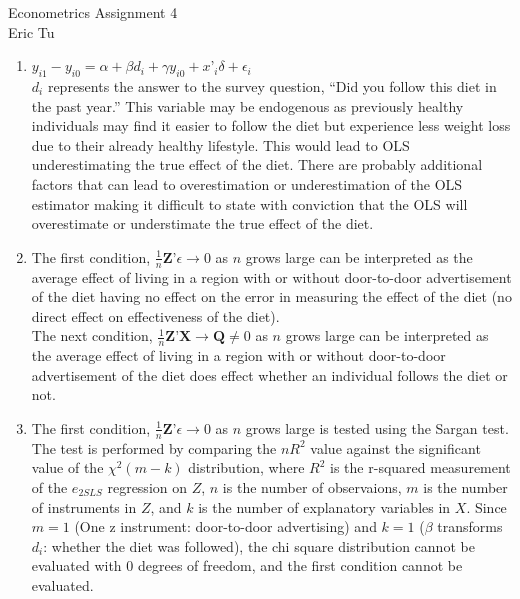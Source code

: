 \documentclass{article}
\begin{document}
\begin{center}
Econometrics Assignment 4 \\
Eric Tu
\end{center}

\begin{enumerate}[label=(\alph*)]
	\item
	$y_{i1} - y_{i0} = \alpha + \beta d_{i} + \gamma y_{i0} + x’_{i}\delta + \epsilon_{i}$ \\
	
	$d_{i}$ represents the answer to the survey question, “Did you follow this diet in the past year.” This variable may be endogenous as previously healthy individuals may find it easier to follow the diet but experience less weight loss due to their already healthy lifestyle. This would lead to OLS underestimating the true effect of the diet. There are probably additional factors that can lead to overestimation or underestimation of the OLS estimator making it difficult to state with conviction that the OLS will overestimate or understimate the true effect of the diet.

	\item 
	The first condition, $\frac{1}{n}\mathbf{Z}’\epsilon \rightarrow 0$ as $n$ grows large can be interpreted as the average effect of living in a region with or without door-to-door advertisement of the diet having no effect on the error in measuring the effect of the diet (no direct effect on effectiveness of the diet). \\
	\smallskip
	The next condition, $\frac{1}{n}\mathbf{Z}’\mathbf{X} \rightarrow \mathbf{Q} \neq 0$ as $n$ grows large can be interpreted as the average effect of living in a region with or without door-to-door advertisement of the diet does effect whether an individual follows the diet or not.
	
	\item
	The first condition, $\frac{1}{n}\mathbf{Z}’\epsilon \rightarrow 0$ as $n$ grows large is tested using the Sargan test. The test is performed by comparing the $nR^{2}$ value against the significant value of the $\chi^{2}(m-k)$ distribution, where $R^{2}$ is the r-squared measurement of the $e_{2SLS}$ regression on $Z$, $n$ is the number of observaions, $m$ is the number of instruments in $Z$, and $k$ is the number of explanatory variables in $X$. Since $m=1$ (One z instrument: door-to-door advertising) and $k=1$ ($\beta$ transforms $d_{i}$: whether the diet was followed), the chi square distribution cannot be evaluated with 0 degrees of freedom, and the first condition cannot be evaluated.
	

\end{enumerate}
\end{document}
